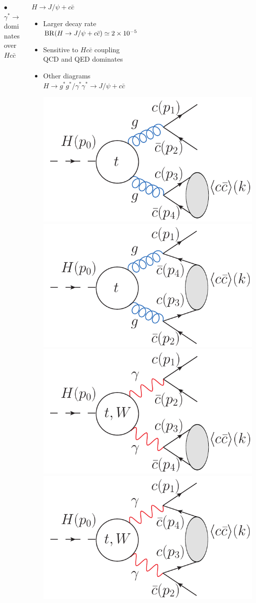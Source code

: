 \documentclass[aspectratio=169]{beamer}
\begin{document}
\begin{frame}
\begin{columns}
\begin{column}{0.45\textwidth}
			\hspace{5mm} $\bullet$ $\gamma^* \to J/\psi$ dominates over $Hc\bar{c}$
		\end{column}
		\begin{column}{0.5\textwidth}
			\vspace{-2mm}
			\textcolor{PittRoyal}{\bf $H\to J/\psi + c\bar{c}$}
			\vspace{1mm}
			\begin{itemize}
				\item Larger decay rate\\
				\hspace{3mm}${\rm BR}(H\to J/\psi + c\bar{c})\simeq 2\times 10^{-5}$
				\item Sensitive to $Hc\bar{c}$ coupling\\
				\hspace{3mm} QCD and QED dominates
				\item Other diagrams\\
				\hspace{5mm} $H\to g^* g^*/\gamma^*\gamma^* \to J/\psi + c\bar c$
				\begin{center}
					\includegraphics[width=.4\textwidth]{figs/Feynman_h_loop/Feynman_h_loop_QCD_CO.pdf}
					\includegraphics[width=.4\textwidth]{figs/Feynman_h_loop/Feynman_h_loop_QCD_CSCO.pdf}
					\includegraphics[width=.4\textwidth]{figs/Feynman_h_loop/Feynman_h_loop_QED_CS.pdf}
					\includegraphics[width=.4\textwidth]{figs/Feynman_h_loop/Feynman_h_loop_QED_CSCO.pdf}
				\end{center}
			\end{itemize}


\end{column}
\end{columns}
\end{frame}
\end{document}

